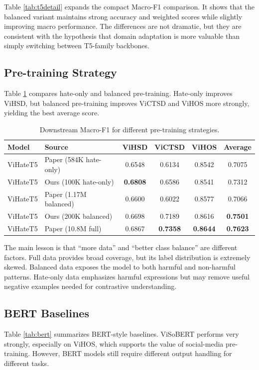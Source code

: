 \documentclass[journal]{IEEEtran}
\newcommand{\mf}{Macro-F1}
\begin{document}
Table \ref{tab:t5detail} expands the compact \mf{} comparison. It shows that the balanced variant maintains strong accuracy and weighted scores while slightly improving macro performance. The differences are not dramatic, but they are consistent with the hypothesis that domain adaptation is more valuable than simply switching between T5-family backbones.

\subsection{Pre-training Strategy}
Table \ref{tab:pretrain} compares hate-only and balanced pre-training. Hate-only improves ViHSD, but balanced pre-training improves ViCTSD and ViHOS more strongly, yielding the best average score.

\begin{table}[!t]
\centering
\caption{Downstream \mf{} for different pre-training strategies.}
\label{tab:pretrain}
\begin{tabular}{llcccc}
\toprule
\textbf{Model} & \textbf{Source} & \textbf{ViHSD} & \textbf{ViCTSD} & \textbf{ViHOS} & \textbf{Average} \\
\midrule
ViHateT5 & Paper (584K hate-only) & 0.6548 & 0.6134 & 0.8542 & 0.7075 \\
ViHateT5 & Ours (100K hate-only) & \textbf{0.6808} & 0.6586 & 0.8541 & 0.7312 \\
ViHateT5 & Paper (1.17M balanced) & 0.6600 & 0.6022 & 0.8577 & 0.7066 \\
ViHateT5 & Ours (200K balanced) & 0.6698 & 0.7189 & 0.8616 & \textbf{0.7501} \\
ViHateT5 & Paper (10.8M full) & 0.6867 & \textbf{0.7358} & \textbf{0.8644} & \textbf{0.7623} \\
\bottomrule
\end{tabular}
\end{table}

The main lesson is that ``more data'' and ``better class balance'' are different factors. Full data provides broad coverage, but its label distribution is extremely skewed. Balanced data exposes the model to both harmful and non-harmful patterns. Hate-only data emphasizes harmful expressions but may remove useful negative examples needed for contrastive understanding.

\subsection{BERT Baselines}
Table \ref{tab:bert} summarizes BERT-style baselines. ViSoBERT performs very strongly, especially on ViHOS, which supports the value of social-media pre-training. However, BERT models still require different output handling for different tasks.
\end{document}
